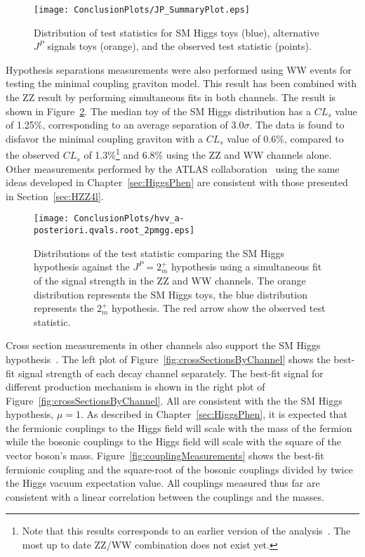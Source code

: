 \begin{figure}
\begin{center}
\texttt{[image: ConclusionPlots/JP\_SummaryPlot.eps]}
\caption{Distribution of test statistics for SM Higgs toys (blue),
 alternative $J^P$ signals toys (orange), and the observed test
statistic (points).}
\label{fig:spinParitySummary}

\end{center}
\end{figure}

Hypothesis separations measurements
were also performed using WW events for testing the minimal coupling
graviton model.
This result has been combined with the ZZ result by performing
simultaneous fits in both channels\cite{CMS:yva}.  The result
is shown in Figure~\ref{fig:2mp_spinCombination}.  The median
toy of the SM Higgs distribution
has a $CL_s$ value of 1.25\%, corresponding to an average
separation of $3.0\sigma$.  The data is found to disfavor the
minimal coupling graviton with a $CL_s$ value of 0.6\%, compared
to the observed $CL_s$ of 1.3\%\footnote{Note that this results
corresponds to an earlier version of the analysis~\cite{CMS:xwa}.
The most up to date ZZ/WW combination does not exist yet.}
and 6.8\% using the ZZ and WW channels alone.  Other measurements
performed by the ATLAS collaboration~\cite{ATLAS:2013mla,ATLAS:2013nma} using the same ideas developed in Chapter~\ref{sec:HiggsPhen}
are consistent with those presented in Section~\ref{sec:HZZ4l}.

\begin{figure}
\begin{center}
\texttt{[image: ConclusionPlots/hvv\_a-posteriori.qvals.root\_2pmgg.eps]}
\caption{Distributions of the test statistic comparing the 
SM Higgs hypothesis against the $J^P=2_m^+$ hypothesis using a
simultaneous fit of the signal strength in the ZZ and WW channels.
The orange distribution represents the SM Higgs toys, the blue 
distribution represents the $2_m^+$ hypothesis.  The red arrow
show the observed test statistic. }
\label{fig:2mp_spinCombination}
\end{center}
\end{figure}

Cross section measurements in other channels also support the 
SM Higgs hypothesis~\cite{CMS:yva}.  The left plot of
Figure~\ref{fig:crossSectionsByChannel} shows the best-fit signal 
strength of each decay channel separately.  The best-fit signal
for different production mechanism is shown
in the right plot of Figure~\ref{fig:crossSectionsByChannel}.
All are consistent with the the SM Higgs hypothesis,
$\mu=1$.  
As described in Chapter~\ref{sec:HiggsPhen}, it is expected that
the fermionic couplings to the Higgs field will scale with the
mass of the fermion while the bosonic couplings to the Higgs field
will scale with the square of the vector boson's mass.  
Figure~\ref{fig:couplingMeasurements} shows the best-fit
fermionic coupling and the square-root of the bosonic couplings
divided by twice the Higgs vacuum expectation value.
All couplings measured thus far are consistent with a linear
correlation between the couplings and the masses.  

